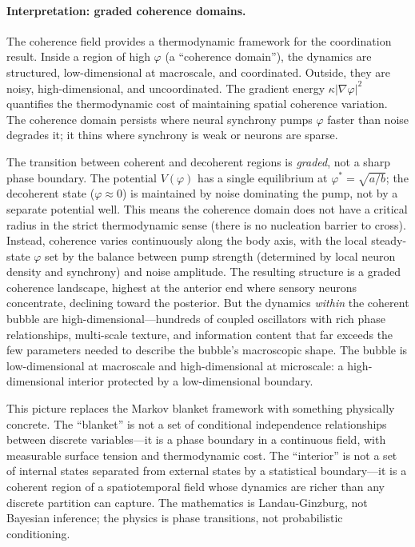 \documentclass[12pt]{article}
\begin{document}
\paragraph{Interpretation: graded coherence domains.} The coherence field provides a thermodynamic framework for the coordination result. Inside a region of high $\varphi$ (a ``coherence domain''), the dynamics are structured, low-dimensional at macroscale, and coordinated. Outside, they are noisy, high-dimensional, and uncoordinated. The gradient energy $\kappa |\nabla\varphi|^2$ quantifies the thermodynamic cost of maintaining spatial coherence variation. The coherence domain persists where neural synchrony pumps $\varphi$ faster than noise degrades it; it thins where synchrony is weak or neurons are sparse.

The transition between coherent and decoherent regions is \textit{graded}, not a sharp phase boundary. The potential $V(\varphi)$ has a single equilibrium at $\varphi^* = \sqrt{a/b}$; the decoherent state ($\varphi \approx 0$) is maintained by noise dominating the pump, not by a separate potential well. This means the coherence domain does not have a critical radius in the strict thermodynamic sense (there is no nucleation barrier to cross). Instead, coherence varies continuously along the body axis, with the local steady-state $\varphi$ set by the balance between pump strength (determined by local neuron density and synchrony) and noise amplitude. The resulting structure is a graded coherence landscape, highest at the anterior end where sensory neurons concentrate, declining toward the posterior. But the dynamics \textit{within} the coherent bubble are high-dimensional---hundreds of coupled oscillators with rich phase relationships, multi-scale texture, and information content that far exceeds the few parameters needed to describe the bubble's macroscopic shape. The bubble is low-dimensional at macroscale and high-dimensional at microscale: a high-dimensional interior protected by a low-dimensional boundary.

This picture replaces the Markov blanket framework with something physically concrete. The ``blanket'' is not a set of conditional independence relationships between discrete variables---it is a phase boundary in a continuous field, with measurable surface tension and thermodynamic cost. The ``interior'' is not a set of internal states separated from external states by a statistical boundary---it is a coherent region of a spatiotemporal field whose dynamics are richer than any discrete partition can capture. The mathematics is Landau-Ginzburg, not Bayesian inference; the physics is phase transitions, not probabilistic conditioning.
\end{document}
